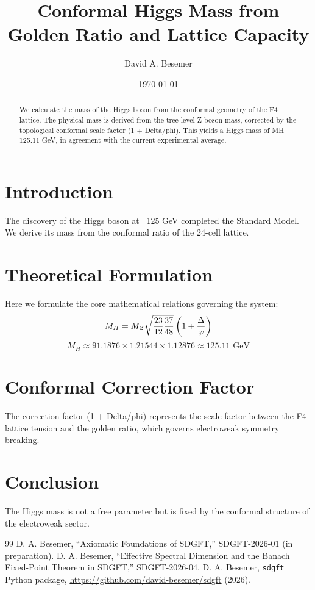 \documentclass[amsmath,amssymb,aps,prd,twocolumn,superscriptaddress,nofootinbib]{revtex4-2}
\begin{document}

\title{Conformal Higgs Mass from Golden Ratio and Lattice Capacity}

\author{David A. Besemer}

\date{\today}

\begin{abstract}
We calculate the mass of the Higgs boson from the conformal geometry of the F4 lattice. The physical mass is derived from the tree-level Z-boson mass, corrected by the topological conformal scale factor (1 + Delta/phi). This yields a Higgs mass of MH ~ 125.11 GeV, in agreement with the current experimental average.
\end{abstract}

\maketitle

\section{Introduction}
The discovery of the Higgs boson at ~125 GeV completed the Standard Model. We derive its mass from the conformal ratio of the 24-cell lattice.

\section{Theoretical Formulation}
Here we formulate the core mathematical relations governing the system:
\begin{equation}
  M_H = M_Z \sqrt{\frac{23}{12} \frac{37}{48}} \left(1 + \frac{\Delta}{\varphi}\right)
\end{equation}
\begin{equation}
  M_H \approx 91.1876 \times 1.21544 \times 1.12876 \approx 125.11 \text{ GeV}
\end{equation}
\section{Conformal Correction Factor}
The correction factor (1 + Delta/phi) represents the scale factor between the F4 lattice tension and the golden ratio, which governs electroweak symmetry breaking.

\section{Conclusion}
The Higgs mass is not a free parameter but is fixed by the conformal structure of the electroweak sector.



\begin{thebibliography}{99}
 D. A. Besemer, ``Axiomatic Foundations of SDGFT,'' SDGFT-2026-01 (in preparation).
 D. A. Besemer, ``Effective Spectral Dimension and the Banach Fixed-Point Theorem in SDGFT,'' SDGFT-2026-04.
 D. A. Besemer, \texttt{sdgft} Python package, \url{https://github.com/david-besemer/sdgft} (2026).
\end{thebibliography}
\end{document}
